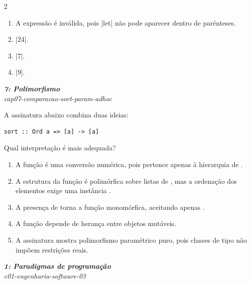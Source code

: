 \documentclass[a4paper,10pt,brazil]{article}
\begin{document}
\begin{multicols}{2}
\begin{enumerate}
  \item A expressão é inválida, pois \haskellinline|let| não pode aparecer dentro de parênteses.

  \item \haskellinline|24|.

  \item \haskellinline|7|.

  \item \haskellinline|9|.


\end{enumerate}

\begin{flushright}
  \footnotesize
  \textit{\textbf{7: Polimorfismo}}\\
  \textit{cap07-comparacao-sort-param-adhoc}\\

\end{flushright}
A assinatura abaixo combina duas ideias:

\begin{verbatim}
sort :: Ord a => [a] -> [a]
\end{verbatim}

Qual interpretação é mais adequada?

\begin{enumerate}
  \item A função é uma conversão numérica, pois  pertence apenas à hierarquia de .
  \item A estrutura da função é polimórfica sobre listas de , mas a ordenação dos elementos exige uma instância .
  \item A presença de  torna a função monomórfica, aceitando apenas .
  \item A função depende de herança entre objetos mutáveis.
  \item A assinatura mostra polimorfismo paramétrico puro, pois classes de tipo não impõem restrições reais.

\end{enumerate}

\begin{flushright}
  \footnotesize
  \textit{\textbf{1: Paradigmas de programação}}\\
  \textit{c01-engenharia-software-03}\\


\end{flushright}
\end{multicols}
\end{document}
